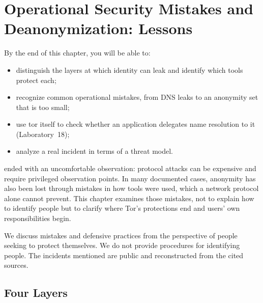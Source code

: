 \chapter{Operational Security Mistakes and Deanonymization: Lessons}\label{cap:28-opsec}

\begin{obiettivi}
By the end of this chapter, you will be able to:
\begin{itemize}[nosep]
  \item distinguish the layers at which identity can leak and identify which tools protect each;
  \item recognize common operational mistakes, from DNS leaks to an anonymity set that is too small;
  \item use tor itself to check whether an application delegates name resolution to it (Laboratory~18);
  \item analyze a real incident in terms of a threat model.
\end{itemize}
\end{obiettivi}

 ended with an uncomfortable observation: protocol attacks can be expensive and require privileged observation points. In many documented cases, anonymity has also been lost through mistakes in how tools were used, which a network protocol alone cannot prevent. This chapter examines those mistakes, not to explain how to identify people but to clarify where Tor's protections end and users' own responsibilities begin.

\begin{attenzione}
We discuss mistakes and defensive practices from the perspective of people seeking to protect themselves. We do not provide procedures for identifying people. The incidents mentioned are public and reconstructed from the cited sources.
\end{attenzione}

\section{Four Layers}\label{sec:opsec-livelli}

